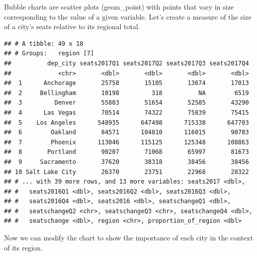 \documentclass[]{book}
\newenvironment{Shaded}{\begin{snugshade}}{\end{snugshade}}
\newcommand{\KeywordTok}[1]{\textcolor[rgb]{0.13,0.29,0.53}{\textbf{{#1}}}}
\newcommand{\DataTypeTok}[1]{\textcolor[rgb]{0.13,0.29,0.53}{{#1}}}
\newcommand{\StringTok}[1]{\textcolor[rgb]{0.31,0.60,0.02}{{#1}}}
\newcommand{\NormalTok}[1]{{#1}}
\theoremstyle{definition}
\theoremstyle{definition}
\theoremstyle{remark}
\begin{document}
Bubble charts are scatter plots (geom\_point) with points that vary in
size corresponding to the value of a given variable. Let's create a
measure of the size of a city's seats relative to its regional total.

\begin{Shaded}
\end{Shaded}

\begin{verbatim}
## # A tibble: 49 x 18
## # Groups:   region [7]
##          dep_city seats2017Q1 seats2017Q2 seats2017Q3 seats2017Q4
##             <chr>       <dbl>       <dbl>       <dbl>       <dbl>
##  1      Anchorage       25758       15105       13674       17013
##  2     Bellingham       10198         318          NA        6519
##  3         Denver       55803       51654       52585       43290
##  4      Las Vegas       70514       74322       75839       75415
##  5    Los Angeles      548935      647498      715338      647703
##  6        Oakland       84571      104810      116015       90703
##  7        Phoenix      113046      115125      125348      108863
##  8       Portland       90207       71068       65997       81673
##  9     Sacramento       37620       38318       38456       38456
## 10 Salt Lake City       26370       23751       22968       28322
## # ... with 39 more rows, and 13 more variables: seats2017 <dbl>,
## #   seats2016Q1 <dbl>, seats2016Q2 <dbl>, seats2016Q3 <dbl>,
## #   seats2016Q4 <dbl>, seats2016 <dbl>, seatschangeQ1 <dbl>,
## #   seatschangeQ2 <chr>, seatschangeQ3 <chr>, seatschangeQ4 <dbl>,
## #   seatschange <dbl>, region <chr>, proportion_of_region <dbl>
\end{verbatim}

Now we can modify the chart to show the importance of each city in the
context of its region.
\end{document}
